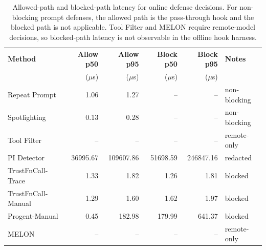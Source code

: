 \begin{table}[t]
\centering
\caption{Allowed-path and blocked-path latency for online defense decisions. For non-blocking prompt defenses, the allowed path is the pass-through hook and the blocked path is not applicable. Tool Filter and MELON require remote-model decisions, so blocked-path latency is not observable in the offline hook harness.}
\label{tab:system-hook-paths}
\small
\begin{tabular}{lrrrrl}
\toprule
\textbf{Method} & \textbf{Allow p50} & \textbf{Allow p95} & \textbf{Block p50} & \textbf{Block p95} & \textbf{Notes} \\
 & ($\mu$s) & ($\mu$s) & ($\mu$s) & ($\mu$s) &  \\
\midrule
Repeat Prompt & 1.06 & 1.27 & -- & -- & non-blocking \\
Spotlighting & 0.13 & 0.28 & -- & -- & non-blocking \\
Tool Filter & -- & -- & -- & -- & remote-only \\
PI Detector & 36995.67 & 109607.86 & 51698.59 & 246847.16 & redacted \\
TrustFnCall-Trace & 1.33 & 1.82 & 1.26 & 1.81 & blocked \\
TrustFnCall-Manual & 1.29 & 1.60 & 1.62 & 1.97 & blocked \\
Progent-Manual & 0.45 & 182.98 & 179.99 & 641.37 & blocked \\
MELON & -- & -- & -- & -- & remote-only \\
\bottomrule
\end{tabular}
\end{table}